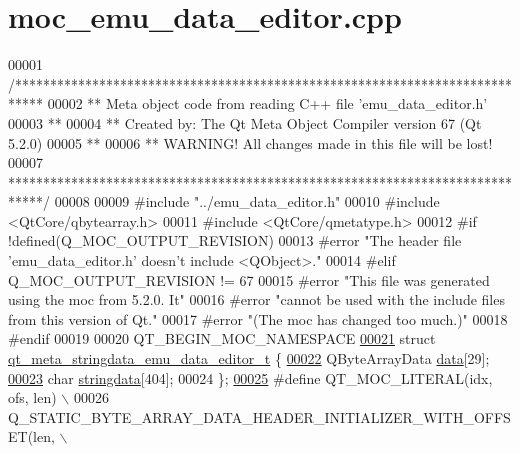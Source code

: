 \hypertarget{a00065_source}{\section{moc\+\_\+emu\+\_\+data\+\_\+editor.\+cpp}
\label{a00065_source}
}

\begin{DoxyCode}
00001 \textcolor{comment}{/****************************************************************************}
00002 \textcolor{comment}{** Meta object code from reading C++ file 'emu\_data\_editor.h'}
00003 \textcolor{comment}{**}
00004 \textcolor{comment}{** Created by: The Qt Meta Object Compiler version 67 (Qt 5.2.0)}
00005 \textcolor{comment}{**}
00006 \textcolor{comment}{** WARNING! All changes made in this file will be lost!}
00007 \textcolor{comment}{*****************************************************************************/}
00008 
00009 \textcolor{preprocessor}{#include "../emu\_data\_editor.h"}
00010 \textcolor{preprocessor}{#include <QtCore/qbytearray.h>}
00011 \textcolor{preprocessor}{#include <QtCore/qmetatype.h>}
00012 \textcolor{preprocessor}{#if !defined(Q\_MOC\_OUTPUT\_REVISION)}
00013 \textcolor{preprocessor}{#error "The header file 'emu\_data\_editor.h' doesn't include <QObject>."}
00014 \textcolor{preprocessor}{#elif Q\_MOC\_OUTPUT\_REVISION != 67}
00015 \textcolor{preprocessor}{#error "This file was generated using the moc from 5.2.0. It"}
00016 \textcolor{preprocessor}{#error "cannot be used with the include files from this version of Qt."}
00017 \textcolor{preprocessor}{#error "(The moc has changed too much.)"}
00018 \textcolor{preprocessor}{#endif}
00019 
00020 QT\_BEGIN\_MOC\_NAMESPACE
\hypertarget{a00065_source_l00021}{}\hyperlink{a00065}{00021} \textcolor{keyword}{struct }\hyperlink{a00065_da/d15/a00188}{qt\_meta\_stringdata\_emu\_data\_editor\_t} \{
\hypertarget{a00065_source_l00022}{}\hyperlink{a00065_a91db052cb5a1fcce8e53e81902e8e90b}{00022}     QByteArrayData \hyperlink{a00065_a91db052cb5a1fcce8e53e81902e8e90b}{data}[29];
\hypertarget{a00065_source_l00023}{}\hyperlink{a00065_ae988ab8add535bff49a0c5d5ec714851}{00023}     \textcolor{keywordtype}{char} \hyperlink{a00065_ae988ab8add535bff49a0c5d5ec714851}{stringdata}[404];
00024 \};
\hypertarget{a00065_source_l00025}{}\hyperlink{a00065_a75bb9482d242cde0a06c9dbdc6b83abe}{00025} \textcolor{preprocessor}{#define QT\_MOC\_LITERAL(idx, ofs, len) \(\backslash\)}
00026 \textcolor{preprocessor}{    Q\_STATIC\_BYTE\_ARRAY\_DATA\_HEADER\_INITIALIZER\_WITH\_OFFSET(len, \(\backslash\)}

\end{DoxyCode}

